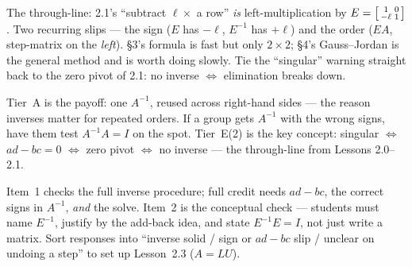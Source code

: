 \documentclass[10pt]{article}
\begin{document}
\begin{teachernote}
The through-line: 2.1's ``subtract $\ell\times$ a row'' \emph{is} left-multiplication by
$E=\begin{bsmallmatrix} 1&0\\-\ell&1 \end{bsmallmatrix}$. Two recurring slips --- the sign ($E$ has
$-\ell$, $E^{-1}$ has $+\ell$) and the order ($EA$, step-matrix on the \emph{left}). \S3's formula is
fast but only $2\times2$; \S4's Gauss--Jordan is the general method and is worth doing slowly. Tie
the ``singular'' warning straight back to the zero pivot of 2.1: no inverse $\Leftrightarrow$
elimination breaks down.
\end{teachernote}

\begin{teachernote}
Tier~A is the payoff: one $A^{-1}$, reused across right-hand sides --- the reason inverses matter for
repeated orders. If a group gets $A^{-1}$ with the wrong signs, have them test $A^{-1}A=I$ on the
spot. Tier~E(2) is the key concept: singular $\Leftrightarrow$ $ad-bc=0$ $\Leftrightarrow$ zero pivot
$\Leftrightarrow$ no inverse --- the through-line from Lessons 2.0--2.1.
\end{teachernote}

\begin{teachernote}
Item~1 checks the full inverse procedure; full credit needs $ad-bc$, the correct signs in $A^{-1}$,
\emph{and} the solve. Item~2 is the conceptual check --- students must name $E^{-1}$, justify by the
add-back idea, and state $E^{-1}E=I$, not just write a matrix. Sort responses into ``inverse solid /
sign or $ad-bc$ slip / unclear on undoing a step'' to set up Lesson~2.3 ($A=LU$).
\end{teachernote}
\end{document}

